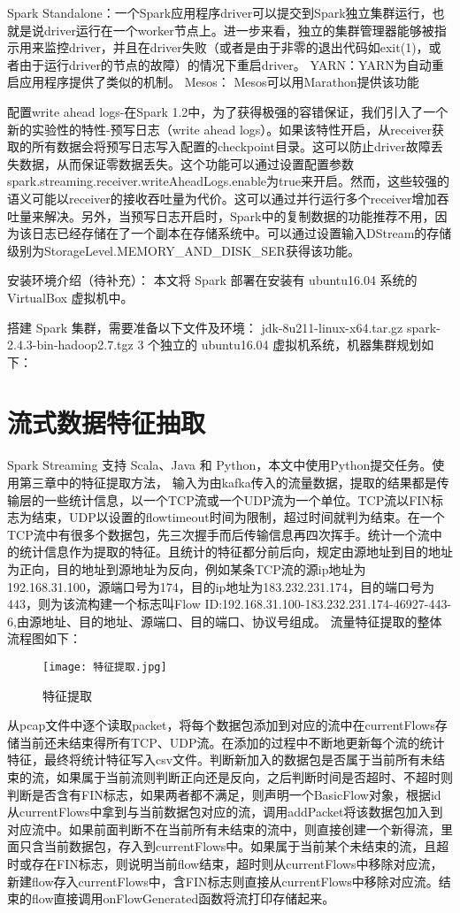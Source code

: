   Spark Standalone：一个Spark应用程序driver可以提交到Spark独立集群运行，也就是说driver运行在一个worker节点上。进一步来看，独立的集群管理器能够被指示用来监控driver，并且在driver失败（或者是由于非零的退出代码如exit(1)，或者由于运行driver的节点的故障）的情况下重启driver。
  YARN：YARN为自动重启应用程序提供了类似的机制。
  Mesos： Mesos可以用Marathon提供该功能
  
  配置write ahead logs-在Spark 1.2中，为了获得极强的容错保证，我们引入了一个新的实验性的特性-预写日志（write ahead logs）。如果该特性开启，从receiver获取的所有数据会将预写日志写入配置的checkpoint目录。这可以防止driver故障丢失数据，从而保证零数据丢失。这个功能可以通过设置配置参数spark.streaming.receiver.writeAheadLogs.enable为true来开启。然而，这些较强的语义可能以receiver的接收吞吐量为代价。这可以通过并行运行多个receiver增加吞吐量来解决。另外，当预写日志开启时，Spark中的复制数据的功能推荐不用，因为该日志已经存储在了一个副本在存储系统中。可以通过设置输入DStream的存储级别为StorageLevel.MEMORY\_AND\_DISK\_SER获得该功能。

安装环境介绍（待补充）：
本文将 Spark 部署在安装有 ubuntu16.04 系统的 VirtualBox 虚拟机中。

搭建 Spark 集群，需要准备以下文件及环境：
jdk-8u211-linux-x64.tar.gz
spark-2.4.3-bin-hadoop2.7.tgz
3 个独立的 ubuntu16.04 虚拟机系统，机器集群规划如下：

\section{流式数据特征抽取}
Spark Streaming 支持 Scala、Java 和 Python，本文中使用Python提交任务。使用第三章中的特征提取方法，
输入为由kafka传入的流量数据，提取的结果都是传输层的一些统计信息，以一个TCP流或一个UDP流为一个单位。TCP流以FIN标志为结束，UDP以设置的flowtimeout时间为限制，超过时间就判为结束。在一个TCP流中有很多个数据包，先三次握手而后传输信息再四次挥手。统计一个流中的统计信息作为提取的特征。且统计的特征都分前后向，规定由源地址到目的地址为正向，目的地址到源地址为反向，例如某条TCP流的源ip地址为192.168.31.100，源端口号为174，目的ip地址为183.232.231.174，目的端口号为443，则为该流构建一个标志叫Flow ID:192.168.31.100-183.232.231.174-46927-443-6,由源地址、目的地址、源端口、目的端口、协议号组成。
流量特征提取的整体流程图如下：

\begin{figure}
    \centering
    \texttt{[image: 特征提取.jpg]}
    \caption{特征提取}
    \label{fig:特征提取}
  \end{figure}

从pcap文件中逐个读取packet，将每个数据包添加到对应的流中在currentFlows存储当前还未结束得所有TCP、UDP流。在添加的过程中不断地更新每个流的统计特征，最终将统计特征写入csv文件。判断新加入的数据包是否属于当前所有未结束的流，如果属于当前流则判断正向还是反向，之后判断时间是否超时、不超时则判断是否含有FIN标志，如果两者都不满足，则声明一个BasicFlow对象，根据id从currentFlows中拿到与当前数据包对应的流，调用addPacket将该数据包加入到对应流中。如果前面判断不在当前所有未结束的流中，则直接创建一个新得流，里面只含当前数据包，存入到currentFlows中。如果属于当前某个未结束的流，且超时或存在FIN标志，则说明当前flow结束，超时则从currentFlows中移除对应流，新建flow存入currentFlows中，含FIN标志则直接从currentFlows中移除对应流。结束的flow直接调用onFlowGenerated函数将流打印存储起来。

